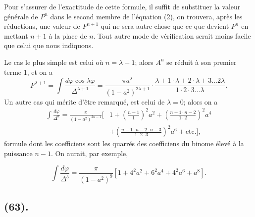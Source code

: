 \documentclass{article}
\begin{document}
Pour s'assurer de l'exactitude de cette formule, il suffit de substituer la valeur générale de $P^{n}$ dans le second membre de l'équation (2), on trouvera, après les réductions, une valeur de $P^{n+1}$ qui ne sera autre chose que ce que devient $P^{n}$ en mettant $n+1$ à la place de $n$. Tout autre mode de vérification serait moins facile que celui que nous indiquons.

Le cas le plus simple est celui où $n=\lambda+1$; alors $A^{n}$ se réduit à son premier terme 1, et on a
\[ P^{\lambda+1}=\int\frac{d\varphi\cos\lambda\varphi}{\Delta^{\lambda+1}}=\frac{\pi a^{\lambda}}{(1-a^{2})^{2\lambda+1}}\cdot\frac{\lambda+1\cdot\lambda+2\cdot\lambda+3\ldots2\lambda}{1\cdot2\cdot3\ldots\lambda}. \tag{4} \]
Un autre cas qui mérite d'être remarqué, est celui de $\lambda=0$; alors on a
\[ \begin{aligned} \int\frac{d\varphi}{\Delta^{n}}=\frac{\pi}{(1-a^{2})^{2n-1}}\Big[&1+\left(\frac{n-1}{1}\right)^{2}a^{2}+\left(\frac{n-1\cdot n-2}{1\cdot2}\right)^{2}a^{4}\\ &+\left(\frac{n-1\cdot n-2\cdot n-3}{1\cdot2\cdot3}\right)^{2}a^{6}+\text{etc.}\Big], \end{aligned} \tag{5} \]
formule dont les coefficiens sont les quarrés des coefficiens du binome élevé à la puissance $n-1$. On aurait, par exemple,

\[ \int\frac{d\varphi}{\Delta^{5}}=\frac{\pi}{(1-a^{2})^{9}}[1+4^{2}a^{2}+6^{2}a^{4}+4^{2}a^{6}+a^{8}]. \]

\subsection*{(63).}
\end{document}
